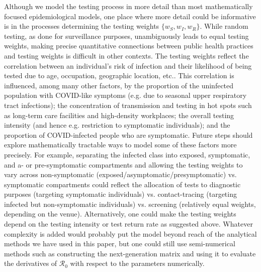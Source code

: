 \documentclass[12pt]{article}
\newcommand{\Rnum}{\ensuremath{\mathcal{R}_0}\xspace}
\DeclareRobustCommand\_{\ifmmode\expandafter\subtxt\else\textunderscore\fi}
\theoremstyle{definition} %
\begin{document}
Although we model the testing process in more detail than most mathematically focused epidemiological models, one place where more detail could be informative is in the processes determining the testing weights $\{w_S, w_I, w_R\}$. While random testing, as done for surveillance purposes, unambiguously leads to equal testing weights, making precise quantitative connections between public health practices and testing weights is difficult in other contexts. The testing weights reflect the correlation between an individual's risk of infection and their likelihood of being tested due to age, occupation, geographic location, etc.. This correlation is influenced, among many other factors, by the proportion of the uninfected population with COVID-like symptoms (e.g. due to seasonal upper respiratory tract infections); the concentration of transmission and testing in hot spots such as long-term care facilities and high-density workplaces; the overall testing intensity (and hence e.g. restriction to symptomatic individuals); and the proportion of COVID-infected people who are symptomatic. Future steps should explore mathematically tractable ways to model some of these factors more precisely. For example, separating the infected class into exposed, symptomatic, and a- or pre-symptomatic compartments and allowing the testing weights to vary across non-symptomatic (exposed/asymptomatic/presymptomatic) vs. symptomatic compartments could reflect the allocation of tests to diagnostic purposes (targeting symptomatic individuals) vs. contact-tracing (targeting infected but non-symptomatic individuals) vs. screening (relatively equal weights, depending on the venue). Alternatively, one could make the testing weights depend on the testing intensity or test return rate as suggested above. Whatever complexity is added would probably put the model beyond reach of the analytical methods we have used in this paper, but one could still use semi-numerical methods such as constructing the next-generation matrix and using it to evaluate the derivatives of $\Rnum$ with respect to the parameters numerically.
\end{document}
